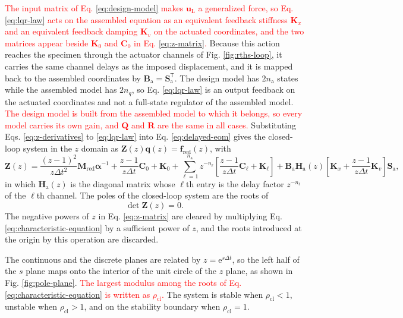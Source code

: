 \documentclass[11pt,a4paper]{article}
\numberwithin{equation}{section}
\newcommand{\rev}[1]{\textcolor{red}{#1}}
\begin{document}
\rev{The input matrix of Eq. \eqref{eq:design-model} makes \(\bm{u}_{\mathrm{L}}\) a generalized force, so Eq. \eqref{eq:lqr-law} acts on the assembled equation as an equivalent feedback stiffness \(\mathbf{K}_{x}\) and an equivalent feedback damping \(\mathbf{K}_{v}\) on the actuated coordinates, and the two matrices appear beside \(\mathbf{K}_{0}\) and \(\mathbf{C}_{0}\) in Eq. \eqref{eq:z-matrix}.} Because this action reaches the specimen through the actuator channels of Fig. \ref{fig:rths-loop}, it carries the same channel delays as the imposed displacement, and it is mapped back to the assembled coordinates by \(\mathbf{B}_{\mathrm{a}}=\mathbf{S}_{\mathrm{a}}^{\mathsf{T}}\). The design model has \(2n_{\mathrm{a}}\) states while the assembled model has \(2n_{q}\), so Eq. \eqref{eq:lqr-law} is an output feedback on the actuated coordinates and not a full-state regulator of the assembled model. \rev{The design model is built from the assembled model to which it belongs, so every model carries its own gain, and \(\mathbf{Q}\) and \(\mathbf{R}\) are the same in all cases.}
Substituting Eqs. \eqref{eq:z-derivatives} to \eqref{eq:lqr-law} into Eq. \eqref{eq:delayed-eom} gives the closed-loop system in the \(z\) domain as \(\mathbf{Z}(z)\bm{q}(z)=\bm{f}_{\mathrm{red}}(z)\), with
\begin{equation}
	\mathbf{Z}(z)=
	\frac{(z-1)^{2}}{z\Delta t^{2}}\mathbf{M}_{\mathrm{red}}\bm{\alpha}^{-1}
	+\frac{z-1}{z\Delta t}\mathbf{C}_{0}+\mathbf{K}_{0}
	+\sum_{\ell=1}^{n_{\mathrm{a}}}z^{-n_{\ell}}
	\left[
	\frac{z-1}{z\Delta t}\mathbf{C}_{\ell}+\mathbf{K}_{\ell}
	\right]
	+\mathbf{B}_{\mathrm{a}}\mathbf{H}_{\mathrm{a}}(z)
	\left[
	\mathbf{K}_{x}+\frac{z-1}{z\Delta t}\mathbf{K}_{v}
	\right]\mathbf{S}_{\mathrm{a}},
	\label{eq:z-matrix}
\end{equation}
in which \(\mathbf{H}_{\mathrm{a}}(z)\) is the diagonal matrix whose \(\ell\)th entry is the delay factor \(z^{-n_{\ell}}\) of the \(\ell\)th channel. The poles of the closed-loop system are the roots of
\begin{equation}
	\det\mathbf{Z}(z)=0.
	\label{eq:characteristic-equation}
\end{equation}
The negative powers of \(z\) in Eq. \eqref{eq:z-matrix} are cleared by multiplying Eq. \eqref{eq:characteristic-equation} by a sufficient power of \(z\), and the roots introduced at the origin by this operation are discarded.

The continuous and the discrete planes are related by \(z=\mathrm{e}^{s\Delta t}\), so the left half of the \(s\) plane maps onto the interior of the unit circle of the \(z\) plane, as shown in Fig. \ref{fig:pole-plane}. \rev{The largest modulus among the roots of Eq. \eqref{eq:characteristic-equation} is written as \(\rho_{\mathrm{cl}}\).} The system is stable when \(\rho_{\mathrm{cl}}<1\), unstable when \(\rho_{\mathrm{cl}}>1\), and on the stability boundary when \(\rho_{\mathrm{cl}}=1\).
\end{document}
